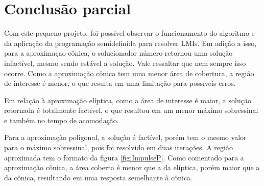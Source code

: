 \section{Conclusão parcial}
Com este pequeno projeto, foi possível observar o funcionamento do algoritmo e da aplicação da programação semidefinida para resolver LMIs. Em adição a isso, para a aproximaçao cônica, o solucionador número retornou uma solução infactível, mesmo sendo estável a solução. Vale ressaltar que nem sempre isso ocorre. Como a aproximação cônica tem uma menor área de cobertura, a região de interesse é menor, o que resulta em uma limitação para possíveis erros.

Em relação à aproximação elíptica, como a área de interesse é maior, a solução retornada é totalmente factível, o que resultou em um menor máximo sobressinal e também no tempo de acomodação.

Para a aproximação poligonal, a solução é factível, porém tem o mesmo valor para o máximo sobressinal, pois foi resolvido em duas iterações. A região aproximada tem o formato da figura \ref{fig:ImpulseP}. Como comentado para a aproximação cônica, a área coberta é menor que a da elíptica, porém maior que a da cônica, resultando em uma resposta semelhante à cônica.